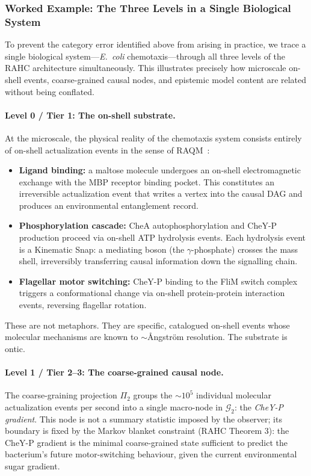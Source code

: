 \documentclass[11pt,a4paper]{article}
\theoremstyle{remark}
\newcommand{\GG}{\mathcal{G}}
\begin{document}
\subsubsection{Worked Example: The Three Levels in a Single Biological System}
\label{subsec:worked_example}

To prevent the category error identified above from arising in practice, we
trace a single biological system---\textit{E.\ coli} chemotaxis---through
all three levels of the RAHC architecture simultaneously. This illustrates
precisely how microscale on-shell events, coarse-grained causal nodes, and
epistemic model content are related without being conflated.

\paragraph{Level 0 / Tier 1: The on-shell substrate.}
At the microscale, the physical reality of the chemotaxis system consists
entirely of on-shell actualization events in the sense of
RAQM~\citep{Sandeman2026a}:
\begin{itemize}[noitemsep]
  \item \textbf{Ligand binding:} a maltose molecule undergoes an on-shell
  electromagnetic exchange with the MBP receptor binding pocket. This
  constitutes an irreversible actualization event that writes a vertex into
  the causal DAG and produces an environmental entanglement record.
  \item \textbf{Phosphorylation cascade:} CheA autophosphorylation and
  CheY-P production proceed via on-shell ATP hydrolysis events. Each
  hydrolysis event is a Kinematic Snap: a mediating boson (the
  $\gamma$-phosphate) crosses the mass shell, irreversibly transferring
  causal information down the signalling chain.
  \item \textbf{Flagellar motor switching:} CheY-P binding to the FliM
  switch complex triggers a conformational change via on-shell
  protein-protein interaction events, reversing flagellar rotation.
\end{itemize}
These are not metaphors. They are specific, catalogued on-shell events whose
molecular mechanisms are known to $\sim$\AA ngstr\"{o}m resolution. The
substrate is ontic.

\paragraph{Level 1 / Tier 2--3: The coarse-grained causal node.}
The coarse-graining projection $\Pi_2$ groups the $\sim 10^5$ individual
molecular actualization events per second into a single macro-node in
$\GG_2$: the \emph{CheY-P gradient}. This node is not a summary statistic
imposed by the observer; its boundary is fixed by the Markov blanket
constraint (RAHC Theorem 3): the CheY-P gradient is the minimal
coarse-grained state sufficient to predict the bacterium's future
motor-switching behaviour, given the current environmental sugar gradient.
\end{document}
